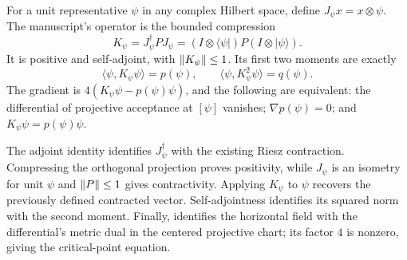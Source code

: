 \begin{lemma}\label{lem:contraction-critical}
  \leanok
  \par
  For a unit representative $\psi$ in any complex Hilbert space, define
  $J_\psi x=x\otimes\psi$. The manuscript's operator is the bounded compression
  \[
    K_\psi=J_\psi^\dagger P J_\psi
      =(I\otimes\langle\psi|)P(I\otimes|\psi\rangle).
  \]
  It is positive and self-adjoint, with $\lVert K_\psi \rVert\le1$. Its first two
  moments are exactly
  \[
    \langle\psi,K_\psi\psi\rangle=p(\psi),\qquad
    \langle\psi,K_\psi^2\psi\rangle=q(\psi).
  \]
  The gradient is $4(K_\psi\psi-p(\psi)\psi)$, and the following are equivalent:
  the differential of projective acceptance at $[\psi]$ vanishes;
  $\nabla p(\psi)=0$; and $K_\psi\psi=p(\psi)\psi$.

  The adjoint identity identifies $J_\psi^\dagger$ with the existing Riesz
  contraction. Compressing the orthogonal projection proves positivity,
  while $J_\psi$ is an isometry for unit $\psi$ and $\lVert P \rVert\le1$ gives
  contractivity. Applying $K_\psi$ to $\psi$ recovers the previously defined
  contracted vector. Self-adjointness identifies its squared norm with the
  second moment. Finally,  identifies
  the horizontal field with the differential's metric dual in the centered
  projective chart; its factor $4$ is nonzero, giving the critical-point equation.
\end{lemma}

